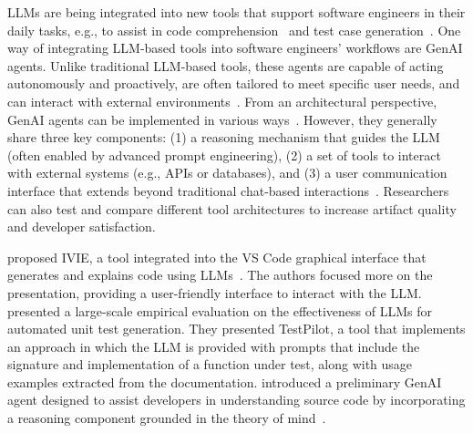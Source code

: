 \label{sec:llms-for-new-software-engineering-tools}


LLMs are being integrated into new tools that support software engineers in their daily tasks, e.g., to assist in code comprehension~\cite{DBLP:conf/chi/YanHWH24} and test case generation~\cite{DBLP:journals/tse/SchaferNET24}.
One way of integrating LLM-based tools into software engineers' workflows are GenAI agents.
Unlike traditional LLM-based tools, these agents are capable of acting autonomously and proactively, are often tailored to meet specific user needs, and can interact with external environments~\cite{takerngsaksiri2024human,wiesinger2025agents}.
From an architectural perspective, GenAI agents can be implemented in various ways~\cite{wiesinger2025agents}.
However, they generally share three key components: (1) a reasoning mechanism that guides the LLM (often enabled by advanced prompt engineering), (2) a set of tools to interact with external systems (e.g., APIs or databases), and (3) a user communication interface that extends beyond traditional chat-based interactions~\cite{DBLP:conf/icsm/RichardsW24, DBLP:journals/tmlr/SumersYN024, DBLP:journals/corr/abs-2309-07870}.
Researchers can also test and compare different tool architectures to increase artifact quality and developer satisfaction.


\citeauthor{DBLP:conf/chi/YanHWH24} proposed IVIE, a tool integrated into the VS Code graphical interface that generates and explains code using LLMs~\cite{DBLP:conf/chi/YanHWH24}.
The authors focused more on the presentation, providing a user-friendly interface to interact with the LLM. 
\citeauthor{DBLP:journals/tse/SchaferNET24}~\cite{DBLP:journals/tse/SchaferNET24} presented a large-scale empirical evaluation on the effectiveness of LLMs for automated unit test generation.
They presented TestPilot, a tool that implements an approach in which the LLM is provided with prompts that include the signature and implementation of a function under test, along with usage examples extracted from the documentation.
\citeauthor{DBLP:conf/icsm/RichardsW24} introduced a preliminary GenAI agent designed to assist developers in understanding source code by incorporating a reasoning component grounded in the theory of mind~\cite{DBLP:conf/icsm/RichardsW24}.


